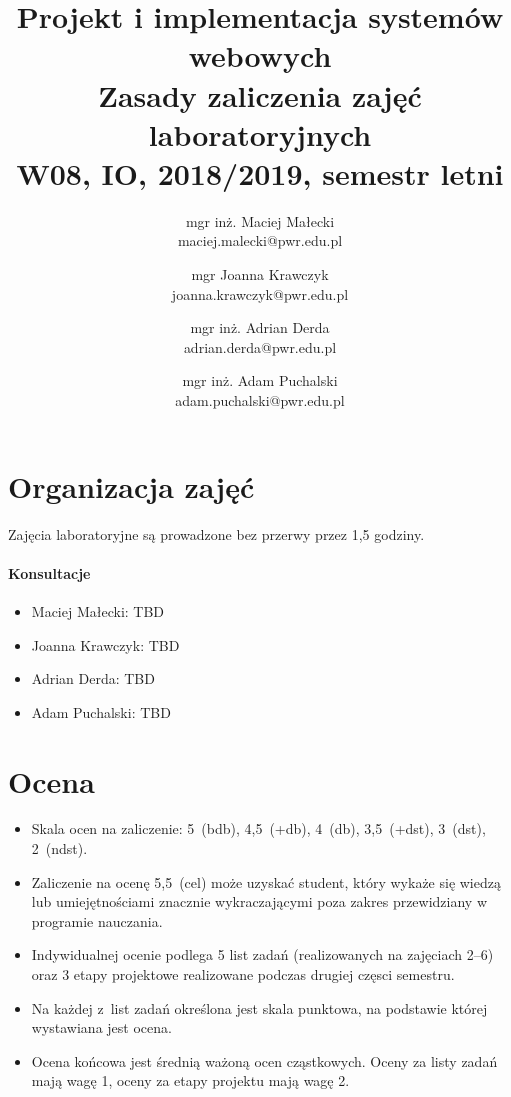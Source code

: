 \documentclass[12pt]{article}
\title{Projekt i implementacja systemów webowych\\
    \large Zasady zaliczenia zajęć laboratoryjnych\\
    \large W08, IO, 2018/2019, semestr letni}
\author{mgr inż. Maciej Małecki\\ \small maciej.malecki@pwr.edu.pl
    \and mgr Joanna Krawczyk\\ \small joanna.krawczyk@pwr.edu.pl
    \and mgr inż. Adrian Derda\\ \small adrian.derda@pwr.edu.pl
    \and mgr inż. Adam Puchalski\\ \small adam.puchalski@pwr.edu.pl}
\begin{document}
    \maketitle

    \section*{Organizacja zajęć}
        Zajęcia laboratoryjne są prowadzone bez przerwy przez 1,5 godziny.
        \paragraph*{Konsultacje}
        \begin{itemize}
            \item Maciej Małecki: TBD
            \item Joanna Krawczyk: TBD
            \item Adrian Derda: TBD
            \item Adam Puchalski: TBD
        \end{itemize}
    \section*{Ocena}
        \begin{itemize}
            \item Skala ocen na zaliczenie: 5~(bdb), 4,5~(+db), 4~(db), 3,5~(+dst), 3~(dst), 2~(ndst).
            \item Zaliczenie na ocenę 5,5~(cel) może uzyskać student, który wykaże się wiedzą lub umiejętnościami znacznie wykraczającymi poza zakres przewidziany w programie nauczania.
            \item Indywidualnej ocenie podlega 5 list zadań (realizowanych na zajęciach 2--6) oraz 3 etapy projektowe realizowane podczas drugiej częsci semestru.
            \item Na każdej z~list zadań określona jest skala punktowa, na podstawie której wystawiana jest ocena.
            \item Ocena końcowa jest średnią ważoną ocen cząstkowych. Oceny za listy zadań mają wagę 1, oceny za etapy projektu mają wagę 2.
        \end{itemize}
\end{document}
